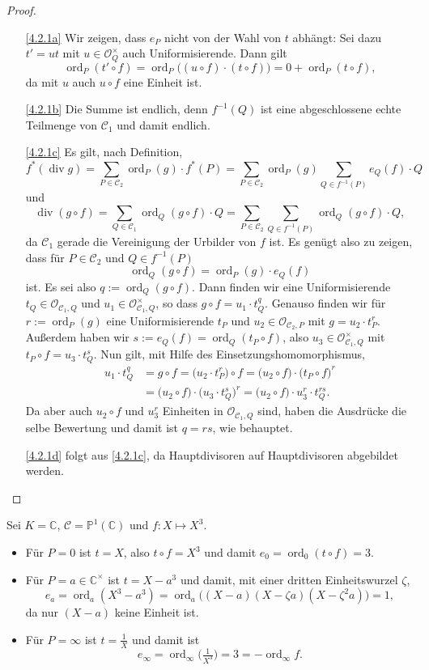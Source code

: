 \documentclass[a4paper,12pt,index=toc]{scrbook}
\theoremstyle{keinenummern} %
\def\C{\mathbb{C}}
\def\CC{\mathcal{C}}
\def\O{\mathcal{O}}
\def\P{\mathbb{P}}
\renewcommand{\div}{\operatorname{div}}
\newcommand{\ord}{\operatorname{ord}}
\begin{document}
\begin{proof}\begin{enumerate}
\item[\ref{4.2.1a}] Wir zeigen, dass $e_{P}$ nicht von der Wahl von $t$ abhängt: Sei dazu $t'=ut$ mit $u\in\O_{Q}^{\times}$ auch Uniformisierende. Dann gilt
\[\ord_{P}(t'\circ f)=\ord_{P}\bigl((u\circ f)\cdot(t\circ f)\bigr)=0+\ord_{P}(t\circ f),\]
da mit $u$ auch $u\circ f$ eine Einheit ist.
\item[\ref{4.2.1b}] Die Summe ist endlich, denn $f^{-1}(Q)$ ist eine abgeschlossene echte Teilmenge von $\CC_{1}$ und damit endlich.
\item[\ref{4.2.1c}] Es gilt, nach Definition,
\[f^{*}(\div g)=\sum_{P\in\CC_{2}}\ord_{P}(g)\cdot f^{*}(P)=\sum_{P\in\CC_{2}}\ord_{P}(g)\sum_{Q\in f^{-1}(P)}e_{Q}(f)\cdot Q\]
und
\[\div(g\circ f)=\sum_{Q\in\CC_{1}}\ord_{Q}(g\circ f)\cdot Q=\sum_{P\in\CC_{2}}\sum_{Q\in f^{-1}(P)}\ord_{Q}(g\circ f)\cdot Q,\]
da $\CC_{1}$ gerade die Vereinigung der Urbilder von $f$ ist. Es genügt also zu zeigen, dass für $P\in\CC_{2}$ und $Q\in f^{-1}(P)$
\[\ord_{Q}(g\circ f)=\ord_{P}(g)\cdot e_{Q}(f)\]
ist. Es sei also $q:=\ord_{Q}(g\circ f)$. Dann finden wir eine Uniformisierende $t_{Q}\in\O_{\CC_{1},Q}$ und $u_{1}\in\O_{\CC_{1},Q}^{\times}$, so dass $g\circ f=u_{1}\cdot t_{Q}^{q}$. Genauso finden wir für $r:=\ord_{P}(g)$ eine Uniformisierende $t_{P}$ und $u_{2}\in\O_{\CC_{2},P}$ mit $g=u_{2}\cdot t_{P}^{r}$. Außerdem haben wir $s:=e_{Q}(f)=\ord_{Q}(t_{P}\circ f)$, also $u_{3}\in\O_{\CC_{1},Q}^{\times}$ mit $t_{P}\circ f=u_{3}\cdot t_{Q}^{s}$. Nun gilt, mit Hilfe des Einsetzungshomomorphismus,
\begin{align*}
u_{1}\cdot t_{Q}^{q}&=g\circ f = \bigl(u_{2}\cdot t_{P}^{r}\bigr)\circ f=\bigl(u_{2}\circ f\bigr)\cdot \bigl(t_{P}\circ f)^{r}\\
&=\bigl(u_{2}\circ f\bigr)\cdot \bigl(u_{3}\cdot t_{Q}^{s}\bigr)^{r}=\bigl(u_{2}\circ f\bigr)\cdot u_{3}^{r}\cdot t_{Q}^{rs}.
\end{align*}
Da aber auch $u_{2}\circ f$ und $u_{3}^{r}$ Einheiten in $\O_{\CC_{1},Q}$ sind, haben die Ausdrücke die selbe Bewertung und damit ist $q=rs$, wie behauptet.
\item[\ref{4.2.1d}] folgt aus \ref{4.2.1c}, da Hauptdivisoren auf Hauptdivisoren abgebildet werden.
\end{enumerate}\end{proof}

\begin{bsp}\label{4.2.2}
Sei $K=\C$, $\CC=\P^{1}(\C)$ und $f\colon X\mapsto X^{3}$.
\begin{itemize}
\item Für $P=0$ ist $t=X$, also $t\circ f=X^{3}$ und damit $e_{0}=\ord_{0}(t\circ f)=3$.
\item Für $P=a\in\C^{\times}$ ist $t=X-a^{3}$ und damit, mit einer dritten Einheitswurzel $\zeta$,
\[e_{a}=\ord_{a}(X^{3}-a^{3})=\ord_{a}\bigl((X-a)(X-\zeta a)(X-\zeta^{2}a)\bigr)=1,\]
da nur $(X-a)$ keine Einheit ist.
\item Für $P=\infty$ ist $t=\frac{1}{X}$ und damit ist
\[e_{\infty}=\ord_{\infty}\bigl(\tfrac{1}{X^{3}}\bigr)=3=-\ord_{\infty}f.\]
\end{itemize}\end{bsp}
\end{document}
